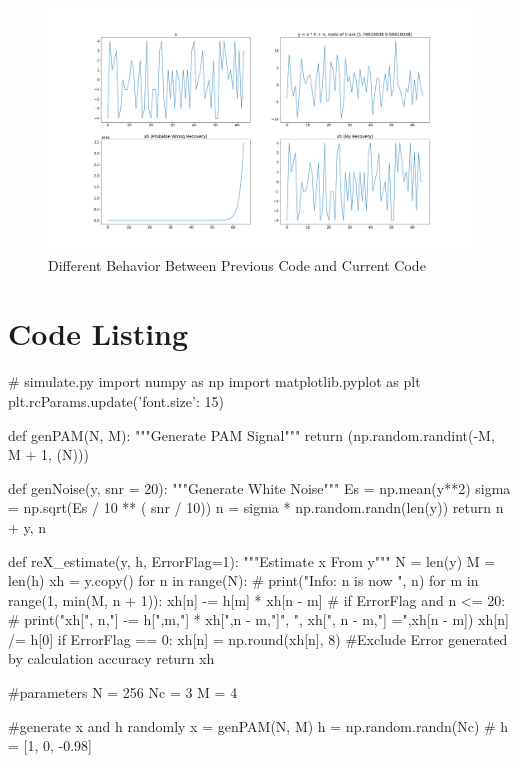\documentclass{article}
\begin{document}
\begin{appendices}
\begin{figure}[!h]
	\centering
	\includegraphics[width=6 in]{../pic/diffRec.png}
	\caption{Different Behavior Between Previous Code and Current Code}
	\label{fig:diffRec}
\end{figure}

\newpage

\section{Code Listing}
\begin{python}
# simulate.py
import numpy as np
import matplotlib.pyplot as plt
plt.rcParams.update({'font.size': 15})

def genPAM(N, M):
    """Generate PAM Signal"""
    return (np.random.randint(-M, M + 1, (N)))

def genNoise(y, snr = 20):
    """Generate White Noise"""
    Es = np.mean(y**2)
    sigma = np.sqrt(Es / 10 ** ( snr / 10))
    n = sigma * np.random.randn(len(y))
    return n + y, n

def reX_estimate(y, h, ErrorFlag=1):
    """Estimate x From y"""
    N = len(y)
    M = len(h)
    xh = y.copy()
    for n in range(N):
        # print("Info: n is now ", n)
        for m in range(1, min(M, n + 1)):
            xh[n] -= h[m] * xh[n - m]
            # if ErrorFlag and n <= 20:
            #     print("xh[", n,"] -= h[",m,"] * xh[",n - m,"]", ", xh[", n - m,"] =",xh[n - m])
        xh[n] /= h[0]
        if ErrorFlag == 0:
            xh[n] = np.round(xh[n], 8) #Exclude Error generated by calculation accuracy
    return xh

#parameters
N = 256
Nc = 3
M = 4

#generate x and h randomly
x = genPAM(N, M)
h = np.random.randn(Nc)
# h = [1, 0, -0.98]


\end{python}
\end{appendices}
\end{document}
